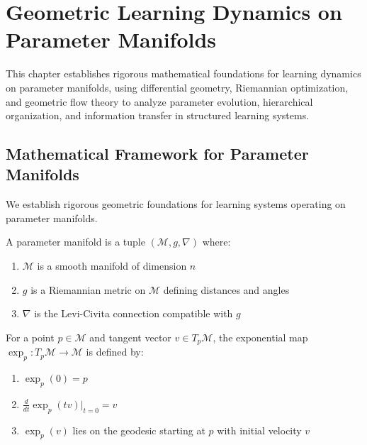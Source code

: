 \chapter{Geometric Learning Dynamics on Parameter Manifolds}

\begin{tcolorbox}[colback=DarkSkyBlue!5!white,colframe=DarkSkyBlue!75!black,title=Chapter Summary]
This chapter establishes rigorous mathematical foundations for learning dynamics on parameter manifolds, using differential geometry, Riemannian optimization, and geometric flow theory to analyze parameter evolution, hierarchical organization, and information transfer in structured learning systems.
\end{tcolorbox}

\section{Mathematical Framework for Parameter Manifolds}

We establish rigorous geometric foundations for learning systems operating on parameter manifolds.

\begin{definition}
\label{def:parameter_manifold}
A parameter manifold is a tuple $(\mathcal{M}, g, \nabla)$ where:
\begin{enumerate}
\item $\mathcal{M}$ is a smooth manifold of dimension $n$
\item $g$ is a Riemannian metric on $\mathcal{M}$ defining distances and angles
\item $\nabla$ is the Levi-Civita connection compatible with $g$
\end{enumerate}
\end{definition}

\begin{definition}
\label{def:exponential_map}
For a point $p \in \mathcal{M}$ and tangent vector $v \in T_p\mathcal{M}$, the exponential map $\exp_p: T_p\mathcal{M} \to \mathcal{M}$ is defined by:
\begin{enumerate}
\item $\exp_p(0) = p$
\item $\frac{d}{dt}\exp_p(tv)|_{t=0} = v$
\item $\exp_p(v)$ lies on the geodesic starting at $p$ with initial velocity $v$
\end{enumerate}
\end{definition}

